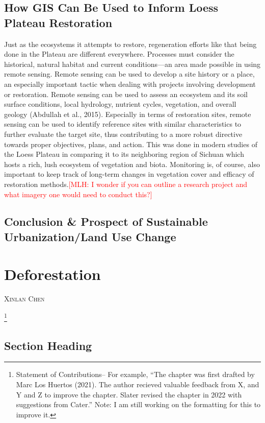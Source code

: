 \documentclass{book}\usepackage{knitr}
\makeatletter
\newcommand{\red}[1]{\textcolor{red}{[MLH: #1]}}
\newcommand{\chapterauthor}[1]{%
  {\parindent0pt\vspace*{-25pt}%
  \linespread{1.1}\large\scshape#1%
  \par\nobreak\vspace*{35pt}}
  \@afterheading%
}
\makeatother
\begin{document}
{\section{How GIS Can Be Used to Inform Loess Plateau Restoration}

Just as the ecosystems it attempts to restore, regeneration efforts like that being done in the Plateau are different everywhere. Processes must consider the historical, natural habitat and current conditions—an area made possible in using remote sensing. Remote sensing can be used to develop a site history or a place, an especially important tactic when dealing with projects involving development or restoration. Remote sensing can be used to assess an ecosystem and its soil surface conditions, local hydrology, nutrient cycles, vegetation, and overall geology (Abdullah et al., 2015). Especially in terms of restoration sites, remote sensing can be used to identify reference sites with similar characteristics to further evaluate the target site, thus contributing to a more robust directive towards proper objectives, plans, and action. This was done in modern studies of the Loess Plateau in comparing it to its neighboring region of Sichuan which hosts a rich, lush ecosystem of vegetation and biota. Monitoring is, of course, also important to keep track of long-term changes in vegetation cover and efficacy of restoration methods.\red{I wonder if you can outline a research project and what imagery one would need to conduct this?}




\section{Conclusion \& Prospect of Sustainable Urbanization/Land Use Change}


\chapter{Deforestation}\label{ch:deforestation}

\chapterauthor{Xinlan Chen}

\footnote{Statement of Contributions-- For example, ``The chapter was first drafted by Marc Los Huertos (2021). The author recieved valuable feedback from X, and Y and Z to improve the chapter. Slater revised the chapter in 2022 with suggestions from Cater.'' Note: I am still working on the formatting for this to improve it.}

\section{Section Heading}%

}
\end{document}
